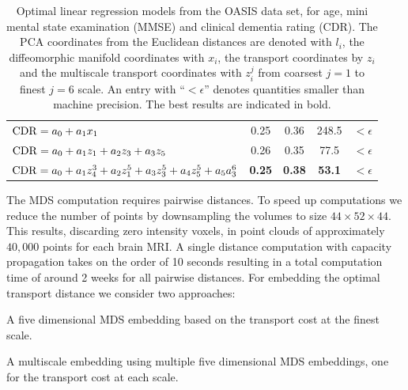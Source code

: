 \documentclass[twoside,11pt]{article}
\begin{document}
\begin{table}[tb]
\begin{footnotesize}
\begin{tabular}{l|c|c|c|c}
${\rm CDR} = a_0 + a_1 x_1$ & 
0.25 & 0.36 & 248.5 & $ <\epsilon$ \\ 
 
${\rm CDR} = a_0 + a_1 z_1 + a_2 z_3 + a_3 z_5$ & 
0.26 & 0.35 & 77.5 & $ < \epsilon$ \\ 

${\rm CDR} = a_0 + a_1 z^3_4 + a_2 z^5_1 + a_3 z^5_3 + a_4 z^5_5 + a_5 a^6_3$ & 
{\bf 0.25} & {\bf 0.38} & {\bf 53.1} & $ < \epsilon$  \\ 

\end{tabular}
\end{footnotesize}
\caption{Optimal linear regression models from the OASIS data set, for  age,
  mini mental state examination (MMSE) and clinical dementia rating (CDR). The
  PCA coordinates from the Euclidean distances are denoted with $l_i$, the
  diffeomorphic manifold coordinates with $x_i$, the transport coordinates by
  $z_i$ and the multiscale transport coordinates with $z_i^j$ from coarsest
  $j=1$ to finest $j=6$ scale.  An entry with ``$ <\epsilon$'' denotes
  quantities smaller than machine precision. The best results are indicated in bold.  }
\label{tab:regression_oasis}
\end{table}
The MDS computation requires pairwise distances.  To speed up computations we
reduce the number of points by downsampling the volumes to size $44 \times 52
\times 44$. This results, discarding zero intensity voxels, in point clouds of
approximately $40,000$ points for each brain MRI. A single distance computation
with capacity propagation takes on the order of 10 seconds resulting in a total
computation time of around 2 weeks for all pairwise distances. For embedding
the optimal transport distance we consider two approaches:
\begin{compactenum}
\item A five dimensional MDS embedding based on the transport cost at the finest
  scale.
\item A multiscale embedding using multiple five dimensional MDS embeddings, one
  for the transport cost at each scale. 
\end{compactenum}
\end{document}
